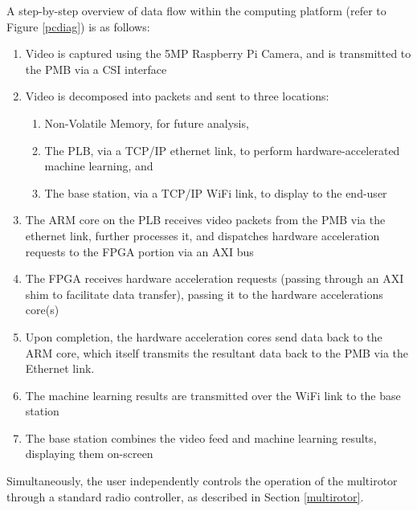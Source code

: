 A step-by-step overview of data flow within the computing platform (refer to Figure \ref{pcdiag}) is as follows:
\begin{enumerate}
\item Video is captured using the 5MP Raspberry Pi Camera, and is transmitted to the PMB via a CSI interface
\item Video is decomposed into packets and sent to three locations:
\begin{enumerate}
\item Non-Volatile Memory, for future analysis, 
\item The PLB, via a TCP/IP ethernet link, to perform hardware-accelerated machine learning, and
\item The base station, via a TCP/IP WiFi link, to display to the end-user
\end{enumerate}
\item The ARM core on the PLB receives video packets from the PMB via the ethernet link, further processes it, and dispatches hardware acceleration requests to the FPGA portion via an AXI bus
\item The FPGA receives hardware acceleration requests (passing through an AXI shim to facilitate data transfer), passing it to the hardware accelerations core(s)
\item Upon completion, the hardware acceleration cores send data back to the ARM core, which itself transmits the resultant data back to the PMB via the Ethernet link.
\item The machine learning results are transmitted over the WiFi link to the base station
\item The base station combines the video feed and machine learning results, displaying them on-screen
\end{enumerate}

Simultaneously, the user independently controls the operation of the multirotor through a standard radio controller, as described in Section \ref{multirotor}.